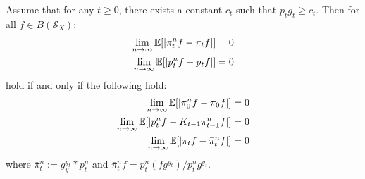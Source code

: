 \begin{theorem} \label{eqn:convergence:lemma:pibar}
	Assume that for any $t\geq 0$, there exists a constant $c_t$ such that $p_tg_t \geq c_t$. Then for all $f \in B(\mathcal{S}_X)$:
	\begin{align}
	\lim_{n\to\infty} \mathbb{E}[ |\pi_t^n f - \pi_t f| ] &= 0  \label{eqn:conv:1}\\
	\lim_{n\to\infty} \mathbb{E}[ |p_t^n f - p_t f|  ] &= 0  \label{eqn:conv:2}
	\end{align} hold if and only if the following hold:
	\begin{align}
	\lim_{n\to\infty} \mathbb{E}[ |\pi_0^n f - \pi_0 f|  ] &= 0 \label{eqn:conv:3} \\
	\lim_{n\to\infty} \mathbb{E}[ |p_t^n f - K_{t-1}\pi^{n}_{t-1} f|] &= 0 \label{eqn:conv:4}\\
	\lim_{n\to\infty} \mathbb{E}[ |\pi_t f - \bar{\pi}^n_t f|] &= 0 \label{eqn:conv:5}
	\end{align} where $\bar{\pi}^n_t := g_y^{y_t} * p_t^n$ and $\bar{\pi}^n_t f =p^n_t(fg^{y_t})/p^n_t g^{y_t} $.
\end{theorem}
